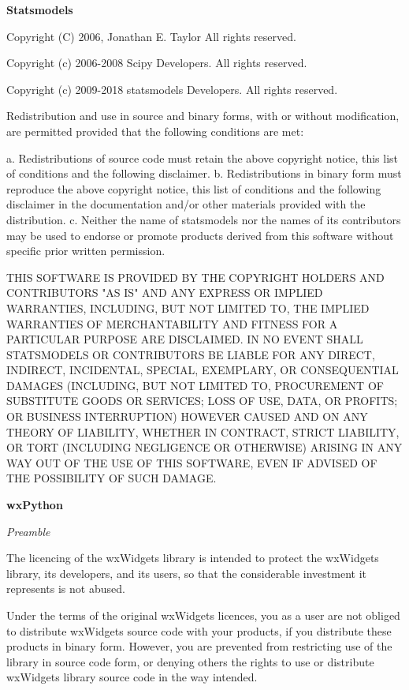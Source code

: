 \textbf{Statsmodels}

Copyright (C) 2006, Jonathan E. Taylor
All rights reserved.

Copyright (c) 2006-2008 Scipy Developers.
All rights reserved.

Copyright (c) 2009-2018 statsmodels Developers.
All rights reserved.


Redistribution and use in source and binary forms, with or without
modification, are permitted provided that the following conditions are met:

a. Redistributions of source code must retain the above copyright notice,
this list of conditions and the following disclaimer.
b. Redistributions in binary form must reproduce the above copyright
notice, this list of conditions and the following disclaimer in the
documentation and/or other materials provided with the distribution.
c. Neither the name of statsmodels nor the names of its contributors
may be used to endorse or promote products derived from this software
without specific prior written permission.


THIS SOFTWARE IS PROVIDED BY THE COPYRIGHT HOLDERS AND CONTRIBUTORS "AS IS"
AND ANY EXPRESS OR IMPLIED WARRANTIES, INCLUDING, BUT NOT LIMITED TO, THE
IMPLIED WARRANTIES OF MERCHANTABILITY AND FITNESS FOR A PARTICULAR PURPOSE
ARE DISCLAIMED. IN NO EVENT SHALL STATSMODELS OR CONTRIBUTORS BE LIABLE FOR
ANY DIRECT, INDIRECT, INCIDENTAL, SPECIAL, EXEMPLARY, OR CONSEQUENTIAL
DAMAGES (INCLUDING, BUT NOT LIMITED TO, PROCUREMENT OF SUBSTITUTE GOODS OR
SERVICES; LOSS OF USE, DATA, OR PROFITS; OR BUSINESS INTERRUPTION) HOWEVER
CAUSED AND ON ANY THEORY OF LIABILITY, WHETHER IN CONTRACT, STRICT
LIABILITY, OR TORT (INCLUDING NEGLIGENCE OR OTHERWISE) ARISING IN ANY WAY
OUT OF THE USE OF THIS SOFTWARE, EVEN IF ADVISED OF THE POSSIBILITY OF SUCH
DAMAGE.

\textbf{wxPython}

\textit{Preamble}

The licencing of the wxWidgets library is intended to protect the wxWidgets
library, its developers, and its users, so that the considerable investment it
represents is not abused.

Under the terms of the original wxWidgets licences, you as a user are not
obliged to distribute wxWidgets source code with your products, if you
distribute these products in binary form. However, you are prevented from
restricting use of the library in source code form, or denying others the
rights to use or distribute wxWidgets library source code in the way intended.

